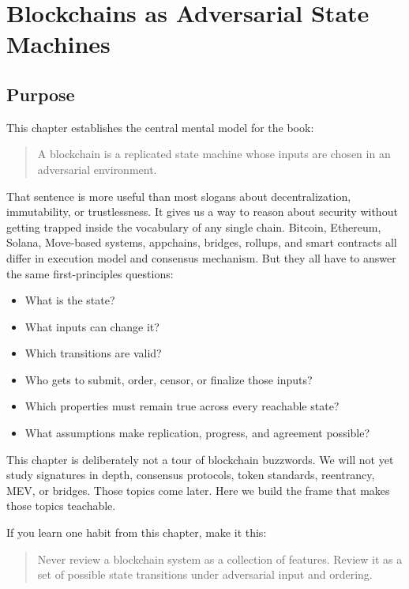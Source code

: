 \chapter{Blockchains as Adversarial State Machines}

\section{Purpose}

This chapter establishes the central mental model for the book:

\begin{quote}
A blockchain is a replicated state machine whose inputs are chosen in an
adversarial environment.
\end{quote}

That sentence is more useful than most slogans about decentralization,
immutability, or trustlessness. It gives us a way to reason about
security without getting trapped inside the vocabulary of any single
chain. Bitcoin, Ethereum, Solana, Move-based systems, appchains,
bridges, rollups, and smart contracts all differ in execution model and
consensus mechanism. But they all have to answer the same
first-principles questions:

\begin{itemize}
\tightlist
\item
  What is the state?
\item
  What inputs can change it?
\item
  Which transitions are valid?
\item
  Who gets to submit, order, censor, or finalize those inputs?
\item
  Which properties must remain true across every reachable state?
\item
  What assumptions make replication, progress, and agreement possible?
\end{itemize}

This chapter is deliberately not a tour of blockchain buzzwords. We will
not yet study signatures in depth, consensus protocols, token standards,
reentrancy, MEV, or bridges. Those topics come later. Here we build the
frame that makes those topics teachable.

If you learn one habit from this chapter, make it this:

\begin{quote}
Never review a blockchain system as a collection of features. Review it
as a set of possible state transitions under adversarial input and
ordering.
\end{quote}

